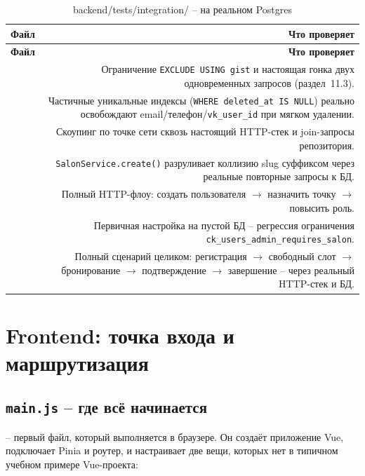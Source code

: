 \begin{xltabular}{\textwidth}{M D}
\caption{backend/tests/integration/ -- на реальном Postgres} \\
\hline
\textbf{Файл} & \textbf{Что проверяет} \\
\hline
\endfirsthead
\hline
\textbf{Файл} & \textbf{Что проверяет} \\
\hline
\endhead
\hline
\endfoot
{} & Ограничение \texttt{EXCLUDE USING gist}
  и настоящая гонка двух одновременных запросов (раздел~11.3). \\
 & Частичные уникальные
  индексы (\texttt{WHERE deleted_at IS NULL}) реально освобождают
  email/телефон/\texttt{vk_user_id} при мягком удалении. \\
 & Скоупинг по точке сети сквозь
  настоящий HTTP-стек и join-запросы репозитория. \\
 & \texttt{SalonService.create()}
  разруливает коллизию slug суффиксом через реальные повторные запросы к
  БД. \\
 & Полный HTTP-флоу:
  создать пользователя $\to$ назначить точку $\to$ повысить роль. \\
 & Первичная настройка на пустой
  БД -- регрессия ограничения \texttt{ck_users_admin_requires_salon}. \\
 & Полный сценарий целиком: регистрация
  $\to$ свободный слот $\to$ бронирование $\to$ подтверждение $\to$
  завершение -- через реальный HTTP-стек и БД. \\
\end{xltabular}

\section{Frontend: точка входа и маршрутизация}

\subsection{\texttt{main.js} -- где всё начинается}

 -- первый файл, который выполняется в
браузере. Он создаёт приложение Vue, подключает Pinia и роутер, и
настраивает две вещи, которых нет в типичном учебном примере Vue-проекта:

